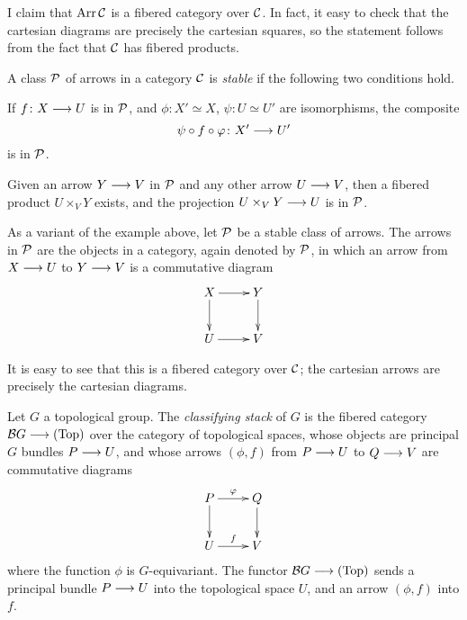 \begin{3   FIBERED CATEGORIES}
\begin{3.2 Examples of fibered categories}
\begin{example}
I claim that $\operatorname{Arr} \mathcal{C}$ is a fibered category over $\mathcal{C}$. In fact, it easy to check that the cartesian diagrams are precisely the cartesian squares, so the statement follows from the fact that $\mathcal{C}$ has fibered products.

\end{example}

\begin{definition}\label{def:stable-class}
A class $\mathcal{P}$ of arrows in a category $\mathcal{C}$ is \emph{stable}%
%
 if the following two conditions hold.

\begin{enumeratea}

\item If $f \colon X \arr U$ is in $\mathcal{P}$, and $\phi \colon X' \simeq X$, $\psi \colon U \simeq U'$ are isomorphisms, the composite
   \[
  \psi \circ f \circ \phi \colon  X' \arr U'
   \]
is in $\mathcal{P}$.

\item Given an arrow $Y \arr V$ in $\mathcal{P}$ and any other arrow $U \arr V$, then a fibered product $U \times_V Y$ exists, and the projection $U \times_V Y \arr U$ is in $\mathcal{P}$.

\end{enumeratea} 
\end{definition}

\begin{example}\label{ex:restrictedarrows} As a variant of the
example above, let $\mathcal{P}$ be a stable class of arrows. The arrows in $\mathcal{P}$ are the objects in a category, again denoted by $\mathcal{P}$, in which an arrow from $X \arr U$ to $Y \arr V$ is a commutative diagram
   \[
   \xymatrix{
   X \ar[r]\ar[d] & Y \ar[d] \\
   U \ar[r]       & V        \\
   }
   \]

It is easy to see that this is a fibered category over $\mathcal{C}$; the cartesian arrows are precisely the cartesian diagrams.

\end{example}


\begin{example}\label{ex:classifying} Let $G$ a topological group. The \emph{classifying stack}%
 of $G$ is the fibered category $\cB G \arr \cattop$ over the category of topological spaces, whose objects are principal $G$ bundles $P \arr U$, and whose arrows $(\phi, f)$ from $P \arr U$ to $Q \arr V$  are commutative diagrams
   \[
   \xymatrix{
   P\ar[r]^\phi\ar[d] & Q\ar[d]\\
   U\ar[r]^f & V
   }
   \]
where the function $\phi$ is $G$-equivariant. The functor $\cB G \arr \cattop$ sends a principal bundle $P \arr U$ into the topological space $U$,  and an arrow $(\phi, f)$ into $f$.


\end{example}
\end{3.2 Examples of fibered categories}
\end{3   FIBERED CATEGORIES}
